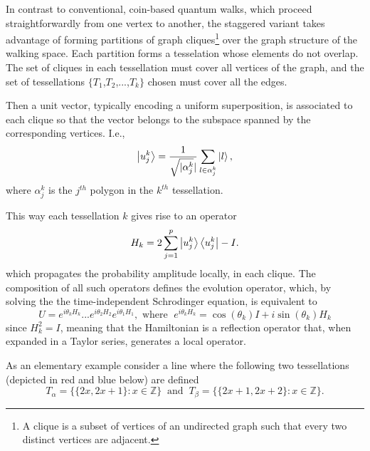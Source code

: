 In contrast to conventional, coin-based quantum walks, which proceed straightforwardly from one vertex to another, the staggered variant  \cite{PortugalSFG16} takes advantage of forming partitions of graph cliques\footnote{A clique is a subset of vertices of an
undirected graph such that every two distinct vertices are adjacent.} over the graph structure of the walking space. Each partition forms a tesselation whose elements do not overlap. The set of
cliques in each tessellation must cover all vertices of the graph, and the set
of tessellations $\{T_{1}$,$T_{2}$,...,$T_{k}\}$ chosen
must cover all the edges.

Then  a unit vector, typically encoding a uniform
superposition, is associated to each clique so that
the vector belongs to the subspace spanned by the corresponding vertices. I.e., 
\begin{equation}
	\ket{u_{j}^{k}} = \frac{1}{\sqrt{\mathopen|\alpha_{j}^{k}}\mathclose|}\sum_{l\in\alpha_{j}^{k}}\ket{l},
\end{equation}
where $\alpha_{j}^{k}$ is the $j^{th}$ polygon in the $k^{th}$ tessellation.

This way each tessellation $k$ gives rise to an operator 
\begin{equation}
	H_k = 2\sum_{j=1}^{p}\ket{u_{j}^{k}}\bra{u_{j}^{k}} - I.
	\label{eq:StagHamil}
\end{equation}
which propagates the probability amplitude locally, in each clique.
The composition of all such operators defines the evolution operator, which, by solving the 
the time-independent Schrodinger equation, is equivalent to 
\begin{equation}
	U = e^{i\theta_{k}H_{k}}...e^{i\theta_{2}H_{2}}e^{i\theta_{1}H_{1}}, \text{  where  }\; e^{i\theta_{k}H_{k}} = \cos{(\theta_k)}I + i\sin{(\theta_k)}H_k
	\label{eq:stagWalkUnmodOp}
\end{equation}
since $H_k^2 = I$, meaning that the Hamiltonian is a reflection operator that,
when expanded in a Taylor series, generates a local operator.

As an elementary example consider a line where the following two tessellations  (depicted in red and blue below) are defined 
\begin{equation}
	T_{\alpha}= \{\{2x,2x+1\}\colon x \in \mathbb{Z}\}\; \; \text{and}\; \; T_{\beta}= \{\{2x+1,2x+2\}\colon x \in \mathbb{Z}\}.
\end{equation}

